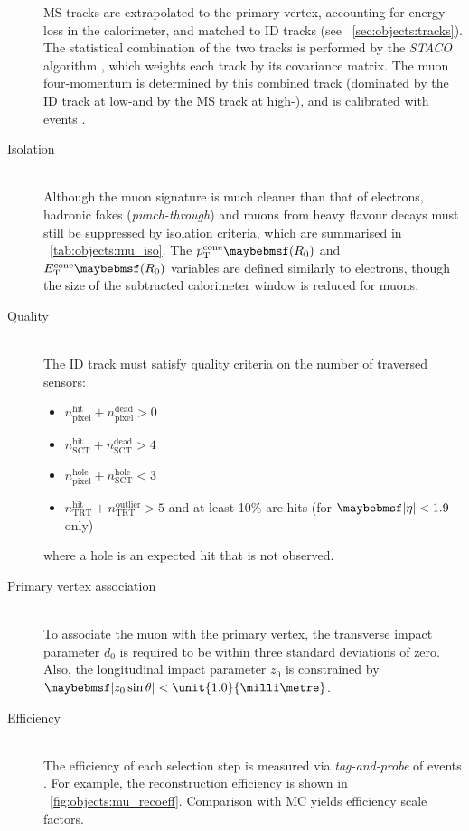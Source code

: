 \begin{description}
	\ac{MS} tracks are extrapolated to the primary vertex, accounting for energy loss in 
	the calorimeter, and matched to \ac{ID} tracks (see 
	\Section~\ref{sec:objects:tracks}). The statistical combination of the two 
	tracks is performed by the \textit{STACO} algorithm \cite{Muons:algorithms}, which
	weights each track by its covariance matrix. The muon four-momentum is determined 
	by this combined track (dominated by the \ac{ID} track at low-\pt and by the 
	\ac{MS} track at high-\pt), and is calibrated with \HepProcess{\PZ \HepTo \Pmu\Pmu}
	events \cite{Muons:2012}.
\item[Isolation] \hfill \\
	Although the muon signature is much cleaner than that of electrons, hadronic fakes 
	(\textit{punch-through}) and muons from heavy flavour decays must still be suppressed 
	by isolation criteria, which are summarised in \Table~\ref{tab:objects:mu_iso}. The 
	$p_{\text{T}}^{\text{cone}}\parenths{R_0}$ and 
	$E_{\text{T}}^{\text{cone}}\parenths{R_0}$ variables are defined similarly to 
	electrons, though the size of the subtracted calorimeter window is reduced for muons.
\item[Quality] \hfill \\
	The \ac{ID} track must satisfy quality criteria on the number of traversed sensors:
	\begin{itemize}[noitemsep,nolistsep]
		\item $n_{\text{pixel}}^{\text{hit}} + n_{\text{pixel}}^{\text{dead}} > 0$
		\item $n_{\text{SCT}}^{\text{hit}} + n_{\text{SCT}}^{\text{dead}} > 4$
		\item $n_{\text{pixel}}^{\text{hole}} + n_{\text{SCT}}^{\text{hole}} < 3$
		\item $n_{\text{TRT}}^{\text{hit}} + n_{\text{TRT}}^{\text{outlier}} > 5$ and at 
		least 10\% are hits (for $\mods{\eta} < 1.9$ only)
	\end{itemize}
	where a hole is an expected hit that is not observed.
\item[Primary vertex association] \hfill \\
	To associate the muon with the primary vertex, the transverse impact parameter $d_0$ 
	is required to be within three standard deviations of zero. Also, the longitudinal 
	impact parameter $z_0$ is constrained by $\mods{z_0 \sin\theta} < 
	\unit{1.0}{\milli\metre}$.
\item[Efficiency] \hfill \\
	The efficiency of each selection step is measured via \textit{tag-and-probe} of 
	\HepProcess{\PZ \HepTo \Pmu\Pmu} events \cite{Muons:2012}. For example, the 
	reconstruction efficiency is shown in \Figure~\ref{fig:objects:mu_recoeff}. 
	Comparison with MC yields efficiency scale factors.
\end{description}

